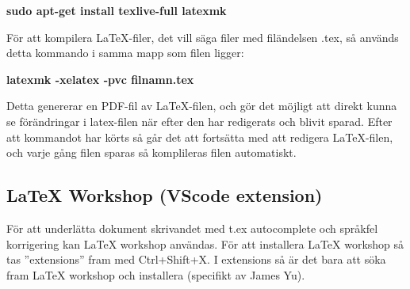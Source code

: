 \documentclass{TDP003mall}
\begin{document}
{\textbf{sudo apt-get install texlive-full latexmk}

För att kompilera LaTeX-filer, det vill säga filer med filändelsen .tex, så används detta kommando i samma mapp som filen ligger:

\textbf{latexmk -xelatex -pvc filnamn.tex}

Detta genererar en PDF-fil av LaTeX-filen, och gör det möjligt att direkt kunna se förändringar i latex-filen när efter den har redigerats och blivit sparad. Efter att kommandot har körts så går det att fortsätta med att redigera LaTeX-filen, och varje gång filen sparas så komplileras filen automatiskt.

\subsection*{LaTeX Workshop (VScode extension)}
För att underlätta dokument skrivandet med t.ex autocomplete och språkfel korrigering kan LaTeX workshop användas. 
För att installera LaTeX workshop så tas ''extensions'' fram med Ctrl+Shift+X. 
I extensions så är det bara att söka fram LaTeX workshop och installera (specifikt av James Yu).\\

}
\end{document}
